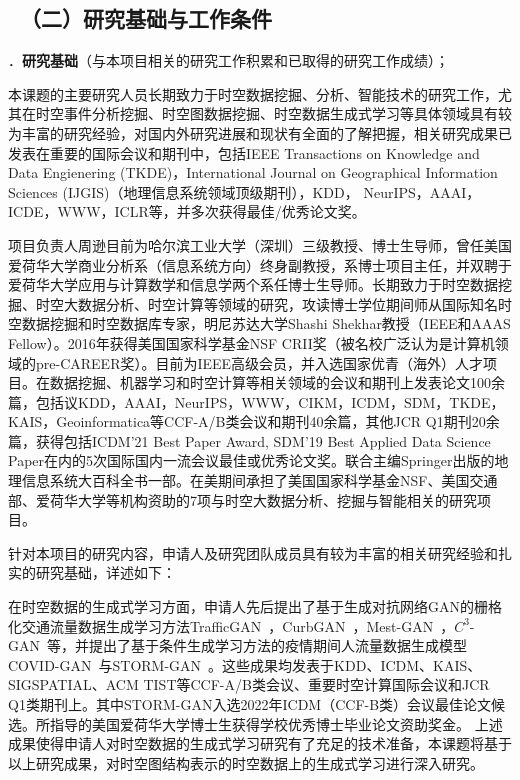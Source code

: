 {\color{MsBlue} \subsection{\sihao \kaishu \quad \ （二）研究基础与工作条件 }}


{\sihao \color{MsBlue} ．{\bfseries 研究基础}（与本项目相关的研究工作积累和已取得的研究工作成绩）；}

本课题的主要研究人员长期致力于时空数据挖掘、分析、智能技术的研究工作，尤其在时空事件分析挖掘、时空图数据挖掘、时空数据生成式学习等具体领域具有较为丰富的研究经验，对国内外研究进展和现状有全面的了解把握，相关研究成果已发表在重要的国际会议和期刊中，包括IEEE Transactions on Knowledge and Data Engienering (TKDE)，International Journal on Geographical Information Sciences (IJGIS)（地理信息系统领域顶级期刊），KDD， NeurIPS，AAAI，ICDE，WWW，ICLR等，并多次获得最佳/优秀论文奖。

项目负责人周逊目前为哈尔滨工业大学（深圳）三级教授、博士生导师，曾任美国爱荷华大学商业分析系（信息系统方向）终身副教授，系博士项目主任，并双聘于爱荷华大学应用与计算数学和信息学两个系任博士生导师。长期致力于时空数据挖掘、时空大数据分析、时空计算等领域的研究，攻读博士学位期间师从国际知名时空数据挖掘和时空数据库专家，明尼苏达大学Shashi Shekhar教授（IEEE和AAAS Fellow）。2016年获得美国国家科学基金NSF CRII奖（被名校广泛认为是计算机领域的pre-CAREER奖）。目前为IEEE高级会员，并入选国家优青（海外）人才项目。在数据挖掘、机器学习和时空计算等相关领域的会议和期刊上发表论文100余篇，包括议KDD，AAAI，NeurIPS，WWW，CIKM，ICDM，SDM，TKDE，KAIS，Geoinformatica等CCF-A/B类会议和期刊40余篇，其他JCR Q1期刊20余篇，获得包括ICDM'21 Best Paper Award, SDM'19 Best Applied Data Science Paper在内的5次国际国内一流会议最佳或优秀论文奖。联合主编Springer出版的地理信息系统大百科全书一部。在美期间承担了美国国家科学基金NSF、美国交通部、爱荷华大学等机构资助的7项与时空大数据分析、挖掘与智能相关的研究项目。

针对本项目的研究内容，申请人及研究团队成员具有较为丰富的相关研究经验和扎实的研究基础，详述如下：

在时空数据的生成式学习方面，申请人先后提出了基于生成对抗网络GAN的栅格化交通流量数据生成学习方法TrafficGAN~\cite{zhang2019trafficgan-x}，CurbGAN~\cite{zhang2020curb-x}，Mest-GAN~\cite{zhang2022mest-x}，$C^3$-GAN~\cite{zhang2021c-x}等，并提出了基于条件生成学习方法的疫情期间人流量数据生成模型COVID-GAN~\cite{}与STORM-GAN~\cite{}。这些成果均发表于KDD、ICDM、KAIS、SIGSPATIAL、ACM TIST等CCF-A/B类会议、重要时空计算国际会议和JCR Q1类期刊上。其中STORM-GAN入选2022年ICDM（CCF-B类）会议最佳论文候选。所指导的美国爱荷华大学博士生获得学校优秀博士毕业论文资助奖金。%
上述成果使得申请人对时空数据的生成式学习研究有了充足的技术准备，本课题将基于以上研究成果，对时空图结构表示的时空数据上的生成式学习进行深入研究。

